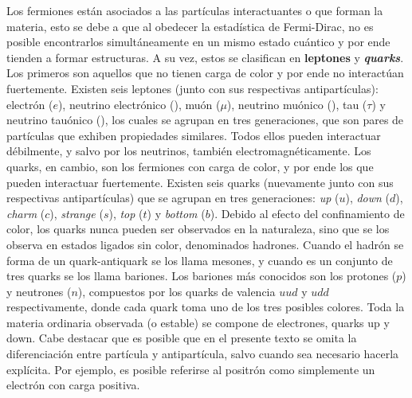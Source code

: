 Los fermiones están asociados a las partículas interactuantes o que forman la materia,
esto se debe a que al obedecer la estadística de Fermi-Dirac, no es posible encontrarlos simultáneamente en un mismo estado cuántico y por ende tienden a formar estructuras. A su vez, estos se clasifican en \textbf{leptones} y \textbf{\textit{quarks}}. Los primeros son aquellos que no tienen carga de color y por ende no interactúan fuertemente. Existen seis leptones (junto con sus respectivas antipartículas): electrón ($e$), neutrino electrónico (\nue), muón ($\mu$), neutrino muónico (\numu), tau ($\tau$) y neutrino tauónico (\nutau), los cuales se agrupan en tres generaciones, que son pares de partículas que exhiben propiedades similares. Todos ellos pueden interactuar débilmente, y salvo por los neutrinos, también electromagnéticamente. Los quarks, en cambio, son los fermiones con carga de color, y por ende los que pueden interactuar fuertemente. Existen seis quarks (nuevamente junto con sus respectivas antipartículas) que se agrupan en tres generaciones: \textit{up} ($u$), \textit{down} ($d$), \textit{charm} ($c$), \textit{strange} ($s$), \textit{top} ($t$) y \textit{bottom} ($b$). Debido al efecto del confinamiento de color, los quarks nunca pueden ser observados en la naturaleza, sino que se los observa en estados ligados sin color, denominados hadrones. Cuando el hadrón se forma de un quark-antiquark se los llama mesones, y cuando es un conjunto de tres quarks se los llama bariones. Los bariones más conocidos son los protones ($p$) y neutrones ($n$), compuestos por los quarks de valencia $uud$ y $udd$ respectivamente, donde cada quark toma uno de los tres posibles colores. Toda la materia ordinaria observada (o estable) se compone de electrones, quarks up y down. Cabe destacar que es posible que en el presente texto se omita la diferenciación entre partícula y antipartícula, salvo cuando sea necesario hacerla explícita. Por ejemplo, es posible referirse al positrón como simplemente un electrón con carga positiva.

